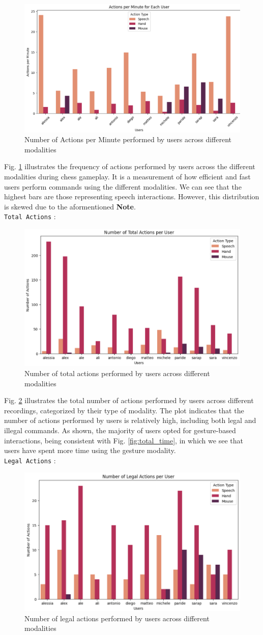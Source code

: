 \documentclass[a4paper, 11pt, twocolumn]{IEEEtran}
\begin{document}
    \begin{figure}
        \centering
        \includegraphics[width=.5\textwidth]{images/actions_per_minutes.png}
        \caption{Number of Actions per Minute performed by users across different modalities}
        \label{fig:actions_per_minutes}
    \end{figure}
    Fig. \ref{fig:actions_per_minutes} illustrates the frequency of actions performed by users across the different modalities during chess gameplay. It is a measurement of how efficient and fast users perform commands using the different modalities. We can see that the highest bars are those representing speech interactions. However, this distribution is skewed due to the aformentioned \textbf{Note}. \\\texttt{Total Actions} : 
    \begin{figure}
        \centering
        \includegraphics[width=.5\textwidth]{images/total_actions.png}
        \caption{Number of total actions performed by users across different modalities}
        \label{fig:total_actions}
    \end{figure}
    Fig. \ref{fig:total_actions} illustrates the total number of actions performed by users across different recordings, categorized by their type of modality. The plot indicates that the number of actions performed by users is relatively high, including both legal and illegal commands. As shown, the majority of users opted for gesture-based interactions, being consistent with Fig. \ref{fig:total_time}, in which we see that users have spent more time using the gesture modality. \\\texttt{Legal Actions} : 
    \begin{figure}
        \centering
        \includegraphics[width=.5\textwidth]{images/legal_actions.png}
        \caption{Number of legal actions performed by users across different modalities}
        \label{fig:legal_actions}
    \end{figure}
\end{document}
